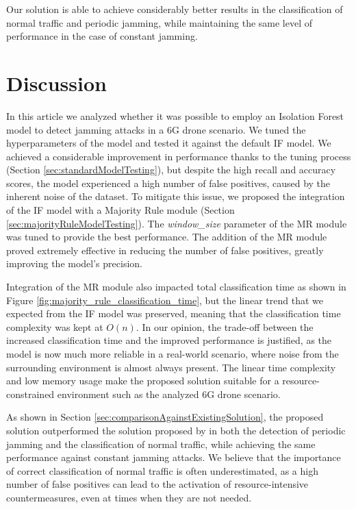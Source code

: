 \documentclass[futureinternet,article,submit,pdftex,moreauthors]{Definitions/mdpi}
\begin{document}
Our solution is able to achieve considerably better results in the classification of normal traffic and periodic jamming, while maintaining the same level of performance in the case of constant jamming.

\section{Discussion}


In this article we analyzed whether it was possible to employ an Isolation Forest model to detect jamming attacks in a 6G drone scenario. We tuned the hyperparameters of the model and tested it against the default IF model. 
We achieved a considerable improvement in performance thanks to the tuning process (Section \ref{sec:standardModelTesting}), but despite the high recall and accuracy scores, the model experienced a high number of false positives, caused by the inherent noise of the dataset. 
To mitigate this issue, we proposed the integration of the IF model with a Majority Rule module (Section \ref{sec:majorityRuleModelTesting}). The \textit{window\_size} parameter of the MR module was tuned to provide the best performance.
The addition of the MR module proved extremely effective in reducing the number of false positives, greatly improving the model's precision. 

Integration of the MR module also impacted total classification time as shown in Figure \ref{fig:majority_rule_classification_time}, but the linear trend \cite{IsolationForestLiu} that we expected from the IF model was preserved, meaning that the classification time complexity was kept at $O(n)$. 
In our opinion, the trade-off between the increased classification time and the improved performance is justified, as the model is now much more reliable in a real-world scenario, where noise from the surrounding environment is almost always present.
The linear time complexity and low memory usage make the proposed solution suitable for a resource-constrained environment such as the analyzed 6G drone scenario.

As shown in Section \ref{sec:comparisonAgainstExistingSolution}, the proposed solution outperformed the solution proposed by \cite{JammingDetectionIoT-Hussain} in both the detection of periodic jamming and the classification of normal traffic, while achieving the same performance against constant jamming attacks. 
We believe that the importance of correct classification of normal traffic is often underestimated, as a high number of false positives can lead to the activation of resource-intensive countermeasures, even at times when they are not needed. 
\end{document}
